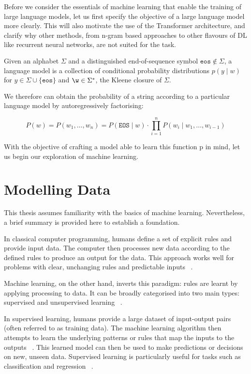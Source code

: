 \documentclass[a4paper, oneside]{discothesis}
\begin{document}
Before we consider the essentials of machine learning that enable the training of large language models, let us first specify the objective of a large language model more clearly. 
This will also motivate the use of the Transformer architecture, and clarify why other methods, from n-gram based approaches to other flavours of DL like recurrent neural networks, are not suited for the task.

\begin{theorem} \label{thm:first theorem}
    Given an alphabet $\Sigma$ and a distinguished end-of-sequence symbol $\texttt{eos} \notin \Sigma$, a
    language model is a collection of conditional probability distributions $p(y \mid w)$ for $y \in \Sigma \cup \{\texttt{eos}\}$ and $\w \in \Sigma^*$,
    the Kleene closure of $\Sigma$.
\end{theorem}

We therefore can obtain the probability of a string according to a particular language model by autoregressively factorising:

\begin{equation}
    P(w) = P(w_1, \ldots, w_n) =  P(\texttt{EOS} \mid w) \cdot \prod_{i=1}^n P(w_i \mid w_1, \ldots, w_{i-1}) 
\end{equation}

With the objective of crafting a model able to learn this function p in mind, let us begin our exploration of machine learning. 

\section{Modelling Data}

This thesis assumes familiarity with the basics of machine learning. Nevertheless, a brief summary is provided here to establish a foundation.

In classical computer programming, humans define a set of explicit rules and provide input data. The computer then processes new data according to the defined rules to produce an output for the data. This approach works well for problems with clear, unchanging rules and predictable inputs ~\cite{russell2010artificial}.

Machine learning, on the other hand, inverts this paradigm: rules are learnt by applying processing to data. It can be broadly categorised into two main types: supervised and unsupervised learning ~\cite{murphy2012machine}.

In supervised learning, humans provide a large dataset of input-output pairs (often referred to as training data). 
The machine learning algorithm then attempts to learn the underlying patterns or rules that map the inputs to the outputs ~\cite{hastie2009elements}. 
This learned model can then be used to make predictions or decisions on new, unseen data.
Supervised learning is particularly useful for tasks such as classification and regression ~\cite{bishop2006pattern}.
\end{document}
